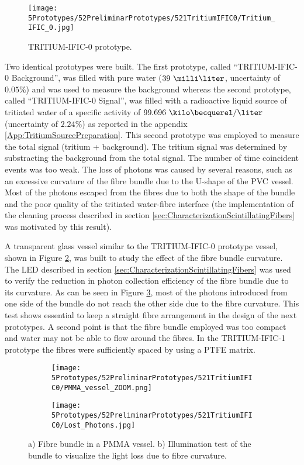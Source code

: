 \begin{figure}[h]
\centering
\texttt{[image: 5Prototypes/52PreliminarPrototypes/521TritiumIFIC0/Tritium\_IFIC\_0.jpg]}
\caption{TRITIUM-IFIC-0 prototype.\label{fig:TritiumIFIC0}}
\end{figure}

Two identical prototypes were built. The first prototype, called ``TRITIUM-IFIC-0 Background'', was filled with pure water ($39~\milli\liter$, uncertainty of $0.05\%$) and was used to measure the background whereas the second prototype, called ``TRITIUM-IFIC-0 Signal'', was filled with a radioactive liquid source of tritiated water of a specific activity of $99.696~\kilo\becquerel/\liter$ (uncertainty of $2.24\%$) as reported in the appendix \ref{App:TritiumSourcePreparation}. This second prototype was employed to measure the total signal (tritium + background). The tritium signal was determined by substracting the background from the total signal. The number of time coincident events was too weak. The loss of photons was caused by several reasons, such as an excessive curvature of the fibre bundle due to the U-shape of the PVC vessel. Most of the photons escaped from the fibres due to both the shape of the bundle and the poor quality of the tritiated water-fibre interface (the implementation of the cleaning process described in section \ref{sec:CharacterizationScintillatingFibers} was motivated by this result). 

A transparent glass vessel similar to the TRITIUM-IFIC-0 prototype vessel, shown in Figure \ref{subfig:PMMAVesselToTestLostPhotons}, was built to study the effect of the fibre bundle curvature. The LED described in section \ref{sec:CharacterizationScintillatingFibers} was used to verify the reduction in photon collection efficiency of the fibre bundle due to its curvature. As can be seen in Figure \ref{subfig:TestLostPhotons}, most of the photons introduced from one side of the bundle do not reach the other side due to the fibre curvature. This test shows essential to keep a straight fibre arrangement in the design of the next prototypes. A second point is that the fibre bundle employed was too compact and water may not be able to flow around the fibres. In the TRITIUM-IFIC-1 prototype the fibres were sufficiently spaced by using a PTFE matrix.

\begin{figure}
\centering
    \begin{subfigure}[b]{0.45\textwidth}
    \centering
    \texttt{[image: 5Prototypes/52PreliminarPrototypes/521TritiumIFIC0/PMMA\_vessel\_ZOOM.png]}  
    \caption{\label{subfig:PMMAVesselToTestLostPhotons}}
    \end{subfigure}
    \hfill
    \begin{subfigure}[b]{0.45\textwidth}
    \centering
    \texttt{[image: 5Prototypes/52PreliminarPrototypes/521TritiumIFIC0/Lost\_Photons.jpg]}  
    \caption{\label{subfig:TestLostPhotons}}
    \end{subfigure}
 \caption{a) Fibre bundle in a PMMA vessel. b) Illumination test of the bundle to visualize the light loss due to fibre curvature.}
 \label{fig:TestLostPhotons}
\end{figure}

